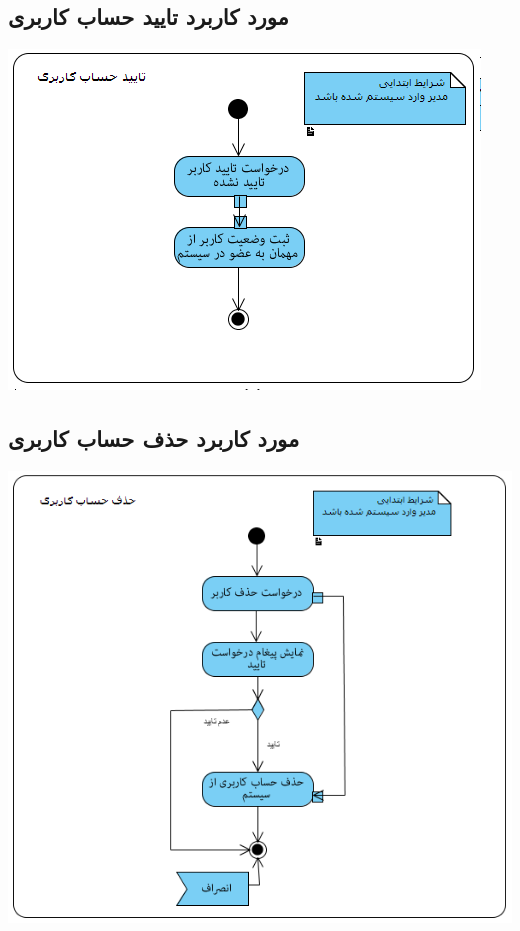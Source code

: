\newpage
\vspace{2cm}
\subsection*{مورد کاربرد تایید حساب کاربری}
\vspace{2cm}
\begin{center}
\includegraphics[width=\textwidth]{ActivityDiagrams/6.png}
\end{center}

\newpage
\vspace{2cm}
\subsection*{مورد کاربرد حذف حساب کاربری}
\vspace{2cm}
\begin{center}
\includegraphics[width=\textwidth]{ActivityDiagrams/7.png}
\end{center}

